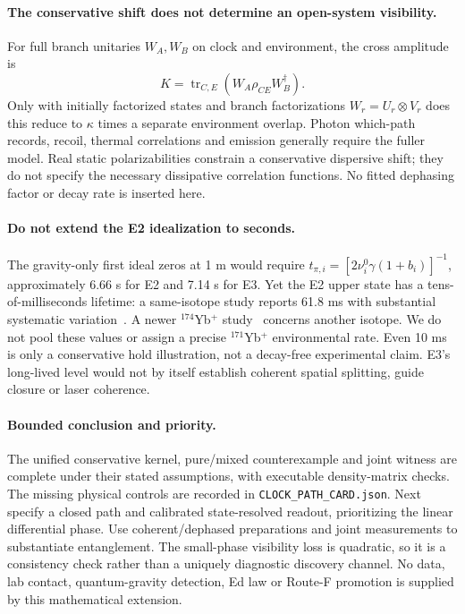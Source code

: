 \documentclass[11pt,a4paper]{article}
\newcommand{\tr}{\operatorname{tr}}
\begin{document}
\paragraph{The conservative shift does not determine an open-system visibility.}
For full branch unitaries $W_A,W_B$ on clock and environment,
the cross amplitude is
\begin{equation}
 K=\tr_{C,E}(W_A\rho_{CE}W_B^\dagger).
\end{equation}
Only with initially factorized states and branch factorizations
$W_r=U_r\otimes V_r$ does this reduce to $\kappa$ times a separate
environment overlap. Photon which-path records, recoil, thermal
correlations and emission generally require the fuller model.
Real static polarizabilities constrain a conservative dispersive
shift; they do not specify the necessary dissipative correlation
functions. No fitted dephasing factor or decay rate is inserted here.

\paragraph{Do not extend the E2 idealization to seconds.}
The gravity-only first ideal zeros at 1 m would require
$t_{\pi,i}=[2\nu_i^0\gamma(1+b_i)]^{-1}$, approximately
6.66 s for E2 and 7.14 s for E3. Yet the E2 upper state has a
tens-of-milliseconds lifetime: a same-isotope study reports
61.8 ms with substantial systematic variation~\cite{schacht}.
A newer $^{174}$Yb$^+$ study~\cite{shao} concerns another isotope.
We do not pool these values or assign a precise $^{171}$Yb$^+$
environmental rate. Even 10 ms is only a conservative hold illustration,
not a decay-free experimental claim. E3's long-lived level would not
by itself establish coherent spatial splitting, guide closure or
laser coherence.

\paragraph{Bounded conclusion and priority.}
The unified conservative kernel, pure/mixed counterexample and
joint witness are complete under their stated assumptions, with
executable density-matrix checks. The missing physical controls are
recorded in \texttt{CLOCK\_PATH\_CARD.json}.
Next specify a closed path and calibrated state-resolved readout,
prioritizing the linear differential phase. Use coherent/dephased
preparations and joint measurements to substantiate entanglement.
The small-phase visibility loss is quadratic, so it is a consistency
check rather than a uniquely diagnostic discovery channel. No data,
lab contact, quantum-gravity detection, Ed law or Route-F promotion
is supplied by this mathematical extension.
\end{document}
